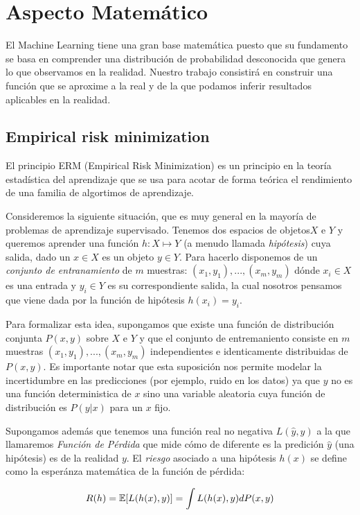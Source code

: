 \chapter{Aspecto Matemático}
El Machine Learning tiene una gran base matemática puesto que su fundamento se basa en comprender una distribución de probabilidad desconocida que genera lo que observamos en la realidad.  
Nuestro trabajo consistirá en construir una función que se aproxime a la real y de la que podamos inferir resultados aplicables en la realidad.


\section{Empirical risk minimization}
El principio ERM (Empirical Risk Minimization) es un principio en la teoría estadística del aprendizaje que se usa para acotar de forma teórica el rendimiento de una familia de algortimos de aprendizaje.  

Consideremos la siguiente situación, que es muy general en la mayoría de problemas de aprendizaje supervisado. Tenemos dos espacios de objetos$ X $ e $Y$ y queremos aprender una función $h: X \mapsto Y $ (a menudo llamada \textit{hipótesis}) cuya salida, dado un $x \in X$ es un objeto $y \in Y$.  
Para hacerlo disponemos de un \textit{conjunto de entranamiento} de $m$ muestras: $(x_1, y_1), ..., (x_m, y_m)$ dónde $x_i \in X$ es una entrada y $y_i \in Y$ es su correspondiente salida, la cual nosotros pensamos que viene dada por la función de hipótesis $h(x_i) = y_i$.  

Para formalizar esta idea, supongamos que existe una función de distribución conjunta $P(x,y)$ sobre $X$ e $Y$ y que el conjunto de entremaniento consiste en $m$ muestras  $(x_1, y_1), ..., (x_m, y_m)$ independientes e identicamente distribuidas de $P(x,y)$. Es importante notar que esta suposición nos permite modelar la incertidumbre en las predicciones (por ejemplo, ruido en los datos) ya que $y$ no es una función deterministica de $x$ sino una variable aleatoria cuya función de distribución es $P(y|x)$ para un $x$ fijo.  

Supongamos además que tenemos una función real no negativa $L(\hat{y}, y)$ a la que llamaremos \textit{Función de Pérdida} que mide cómo de diferente es la predición $\hat{y}$ (una hipótesis) es de la realidad $y$. El \textit{riesgo} asociado a una hipótesis $h(x)$ se define como la esperánza matemática de la función de pérdida:

$$ R(h) = \operatorname{\mathbb{E}} [L(h(x), y)] = \int L(h(x),y)dP(x,y) $$

